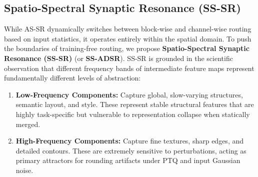 \documentclass{article}
\theoremstyle{plain}
\theoremstyle{definition}
\theoremstyle{remark}
\begin{document}
    \subsection{Spatio-Spectral Synaptic Resonance (SS-SR)}
    While AS-SR dynamically switches between block-wise and channel-wise routing based on input statistics, it operates entirely within the spatial domain. To push the boundaries of training-free routing, we propose \textbf{Spatio-Spectral Synaptic Resonance (SS-SR)} (or \textbf{SS-ADSR}). SS-SR is grounded in the scientific observation that different frequency bands of intermediate feature maps represent fundamentally different levels of abstraction:
    \begin{enumerate}
        \item \textbf{Low-Frequency Components:} Capture global, slow-varying structures, semantic layout, and style. These represent stable structural features that are highly task-specific but vulnerable to representation collapse when statically merged.
        \item \textbf{High-Frequency Components:} Capture fine textures, sharp edges, and detailed contours. These are extremely sensitive to perturbations, acting as primary attractors for rounding artifacts under PTQ and input Gaussian noise.
    \end{enumerate}
\end{document}
